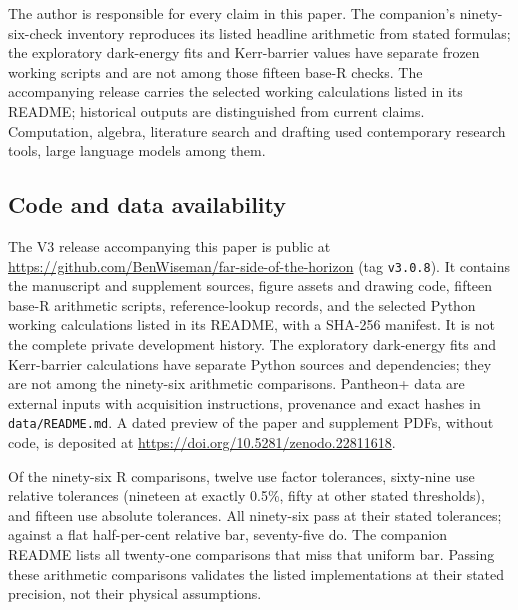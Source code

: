 \documentclass[
]{article}
\begin{document}
The author is responsible for every claim in this paper. The companion's
ninety-six-check inventory reproduces its listed headline arithmetic
from stated formulas; the exploratory dark-energy fits and Kerr-barrier
values have separate frozen working scripts and are not among those
fifteen base-R checks. The accompanying release carries the selected
working calculations listed in its README; historical outputs are
distinguished from current claims. Computation, algebra, literature
search and drafting used contemporary research tools, large language
models among them.

\subsection{Code and data
availability}\label{code-and-data-availability}

The V3 release accompanying this paper is public at
\url{https://github.com/BenWiseman/far-side-of-the-horizon} (tag
\texttt{v3.0.8}). It contains the manuscript and supplement sources,
figure assets and drawing code, fifteen base-R arithmetic scripts,
reference-lookup records, and the selected Python working calculations
listed in its README, with a SHA-256 manifest. It is not the complete
private development history. The exploratory dark-energy fits and
Kerr-barrier calculations have separate Python sources and dependencies;
they are not among the ninety-six arithmetic comparisons. Pantheon+ data
are external inputs with acquisition instructions, provenance and exact
hashes in \texttt{data/README.md}. A dated preview of the paper and
supplement PDFs, without code, is deposited at
\url{https://doi.org/10.5281/zenodo.22811618}.

Of the ninety-six R comparisons, twelve use factor tolerances,
sixty-nine use relative tolerances (nineteen at exactly 0.5\%, fifty at
other stated thresholds), and fifteen use absolute tolerances. All
ninety-six pass at their stated tolerances; against a flat half-per-cent
relative bar, seventy-five do. The companion README lists all twenty-one
comparisons that miss that uniform bar. Passing these arithmetic
comparisons validates the listed implementations at their stated
precision, not their physical assumptions.
\end{document}
